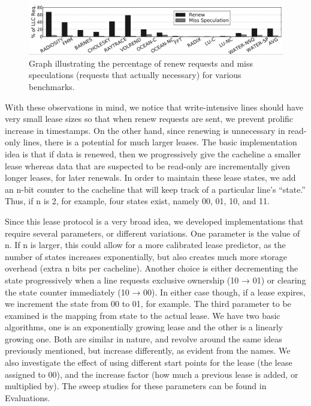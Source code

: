 \documentclass[12pt]{article}
\begin{document}
\begin{figure}
\begin{center}
  \includegraphics[width=16cm]{image1.png}
  \caption{Graph illustrating the percentage of renew requests and miss speculations (requests that actually necessary) for various benchmarks. }
  \label{fig:renewals}
\end{center}
\end{figure}

With these observations in mind, we notice that write-intensive lines should have very small lease sizes so that when renew requests are sent, we prevent prolific increase in timestamps. On the other hand, since renewing is unnecessary in read-only lines, there is a potential for much larger leases.
The basic implementation idea is that if data is renewed, then we progressively give the cacheline a smaller lease whereas data that are suspected to be read-only are incrementally given longer leases, for later renewals. In order to maintain these lease states, we add an n-bit counter to the cacheline that will keep track of a particular line’s “state.” Thus, if n is 2, for example, four states exist, namely 00, 01, 10, and 11. 

Since this lease protocol is a very broad idea, we developed implementations that require several parameters, or different variations. One parameter is the value of n. If n is larger, this could allow for a more calibrated lease predictor, as the number of states increases exponentially, but also creates much more storage overhead (extra n bits per cacheline). Another choice is either decrementing the state progressively when a line requests exclusive ownership (10 → 01) or clearing the state counter immediately (10 → 00). In either case though, if a lease expires, we increment the state from 00 to 01, for example. The third parameter to be examined is the mapping from state to the actual lease. We have two basic algorithms, one is an exponentially growing lease and the other is a linearly growing one. Both are similar in nature, and revolve around the same ideas previously mentioned, but increase differently, as evident from the names. We also investigate the effect of using different start points for the lease (the lease assigned to 00), and the increase factor (how much a previous lease is added, or multiplied by). The sweep studies for these parameters can be found in Evaluations.
\end{document}
